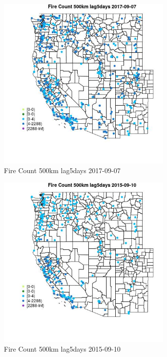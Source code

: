 \begin{figure} 
\centering  
\includegraphics[width=0.77\textwidth]{Code_Outputs/Report_ML_input_PM25_Step4_part_e_de_duplicated_aves_compiled_2019-05-20wNAs_MapObsFire_Count_500km_lag5days2017-09-07.jpg} 
\caption{\label{fig:Report_ML_input_PM25_Step4_part_e_de_duplicated_aves_compiled_2019-05-20wNAsMapObsFire_Count_500km_lag5days2017-09-07}Fire Count 500km lag5days 2017-09-07} 
\end{figure} 
 

\begin{figure} 
\centering  
\includegraphics[width=0.77\textwidth]{Code_Outputs/Report_ML_input_PM25_Step4_part_e_de_duplicated_aves_compiled_2019-05-20wNAs_MapObsFire_Count_500km_lag5days2015-09-10.jpg} 
\caption{\label{fig:Report_ML_input_PM25_Step4_part_e_de_duplicated_aves_compiled_2019-05-20wNAsMapObsFire_Count_500km_lag5days2015-09-10}Fire Count 500km lag5days 2015-09-10} 
\end{figure} 
 

